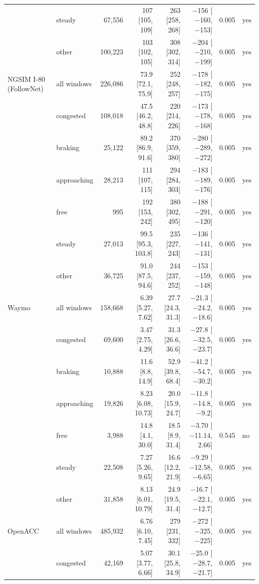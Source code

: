 \begin{longtable}{llrrrrrl}
 & steady & 67,556 & 107 [105, 109] & 263 [258, 268] & $-$156 [$-$160, $-$153] & 0.005 & yes \\
 & other & 100,223 & 103 [102, 105] & 308 [302, 314] & $-$204 [$-$210, $-$199] & 0.005 & yes \\
\midrule
NGSIM I-80 (FollowNet) & all windows & 226,086 & 73.9 [72.1, 75.9] & 252 [248, 257] & $-$178 [$-$182, $-$175] & 0.005 & yes \\
 & congested & 108,018 & 47.5 [46.2, 48.8] & 220 [214, 226] & $-$173 [$-$178, $-$168] & 0.005 & yes \\
 & braking & 25,122 & 89.2 [86.9, 91.6] & 370 [359, 380] & $-$280 [$-$289, $-$272] & 0.005 & yes \\
 & approaching & 28,213 & 111 [107, 115] & 294 [284, 303] & $-$183 [$-$189, $-$176] & 0.005 & yes \\
 & free & 995 & 192 [153, 242] & 380 [302, 495] & $-$188 [$-$291, $-$120] & 0.005 & yes \\
 & steady & 27,013 & 99.5 [95.3, 103.8] & 235 [227, 243] & $-$136 [$-$141, $-$131] & 0.005 & yes \\
 & other & 36,725 & 91.0 [87.5, 94.6] & 244 [237, 252] & $-$153 [$-$159, $-$148] & 0.005 & yes \\
\midrule
Waymo & all windows & 158,668 & 6.39 [5.27, 7.62] & 27.7 [24.3, 31.3] & $-$21.3 [$-$24.2, $-$18.6] & 0.005 & yes \\
 & congested & 69,600 & 3.47 [2.75, 4.29] & 31.3 [26.6, 36.6] & $-$27.8 [$-$32.5, $-$23.7] & 0.005 & yes \\
 & braking & 10,888 & 11.6 [8.8, 14.9] & 52.9 [39.8, 68.4] & $-$41.2 [$-$54.7, $-$30.2] & 0.005 & yes \\
 & approaching & 19,826 & 8.23 [6.08, 10.73] & 20.0 [15.9, 24.7] & $-$11.8 [$-$14.8, $-$9.2] & 0.005 & yes \\
 & free & 3,988 & 14.8 [4.1, 30.0] & 18.5 [8.9, 31.4] & $-$3.70 [$-$11.14, 2.66] & 0.545 & no \\
 & steady & 22,508 & 7.27 [5.26, 9.65] & 16.6 [12.2, 21.9] & $-$9.29 [$-$12.58, $-$6.65] & 0.005 & yes \\
 & other & 31,858 & 8.13 [6.01, 10.79] & 24.9 [19.5, 31.4] & $-$16.7 [$-$22.1, $-$12.7] & 0.005 & yes \\
\midrule
OpenACC & all windows & 485,932 & 6.76 [6.10, 7.45] & 279 [231, 332] & $-$272 [$-$325, $-$225] & 0.005 & yes \\
 & congested & 42,169 & 5.07 [3.77, 6.66] & 30.1 [25.8, 34.9] & $-$25.0 [$-$28.7, $-$21.7] & 0.005 & yes \\

\end{longtable}
